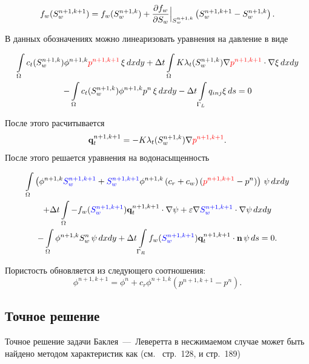 \begin{equation}
	f_w(S_w^{n+1, k+1}) = f_w(S_w^{n+1, k}) + \dfrac{\partial f_w}{\partial S_w}\Bigl|_{S_w^{n+1, k}}\Bigr. \left( S_w^{n+1, k+1} - S_w^{n+1, k} \right) .
\end{equation}

В данных обозначениях можно линеаризовать уравнения на давление в виде

\begin{multline}
	 \int\limits_\Omega c_t (S_w^{n+1, k})\phi^{n+1, k} {\color{red}p^{n+1, k+1}}\, \xi \,dx dy 
	 + \Delta t \int\limits_\Omega K \lambda_t (S_w^{n+1, k}) \nabla {\color{red}p^{n+1, k+1} }\cdot \nabla\xi \,dx dy \\ -\int\limits_\Omega c_t (S_w^{n+1, k})\phi^{n+1, k} p^{n}\, \xi \,dx dy-\Delta t \int\limits_{\Gamma_L} q_{inj} \xi \, ds=0
\end{multline}

После этого расчитывается 
\begin{equation}
	\mathbf{q}_t^{n+1, k+1} = -K\lambda_t (S_w^{n+1,k})\nabla {\color{red}p^{n+1, k+1} }.
\end{equation}
После этого решается уравнения на водонасыщенность

\begin{multline}
	\int\limits_\Omega \left(\phi^{n+1,k} {\color{blue}S_w^{n+1,k+1}} + {\color{blue}S_w^{n+1,k+1}}\phi^{n+1,k}\left(c_r + c_w \right)({\color{red}p^{n+1,k+1}} - p^n)  \right)\,\psi \,dx dy \\
	+ \Delta t\int\limits_\Omega -f_w ({\color{blue}S_w^{n+1,k+1}}) \mathbf{q}_t^{n+1, k+1} \cdot \nabla \psi +  \varepsilon \nabla {\color{blue}S_w^{n+1,k+1}} \cdot \nabla \psi \,dx dy \\
	-\int\limits_\Omega \phi^{n+1,k} S_w^{n} \,\psi \,dx dy
	+\Delta t\int\limits_{\Gamma_R} f_w({\color{blue}S_w^{n+1,k+1}}) \mathbf{q}_t^{n+1, k+1} \cdot \mathbf{n} \,\psi \, ds = 0.
\end{multline}

Пористость обновляется из следующего соотношения:
\begin{equation}
	\phi^{n+1, k+1} = \phi^n + c_r \phi^{n+1, k} (p^{n+1, k+1} - p^n).
\end{equation}

\subsection{Точное решение }

Точное решение задачи Баклея~---~Леверетта в несжимаемом случае может быть найдено методом характеристик как (см.~\cite{Barenblatt_Entov_Ryzhik_1984} стр.~128, и \cite{Collins_1984} стр.~189)

